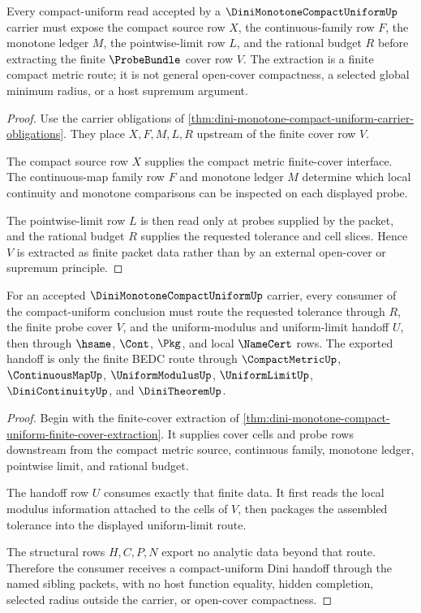 \begin{theorem}
\label{thm:dini-monotone-compact-uniform-finite-cover-extraction}
Every compact-uniform read accepted by a $\DiniMonotoneCompactUniformUp$ carrier must expose the compact source row $X$, the continuous-family row $F$, the monotone ledger $M$, the pointwise-limit row $L$, and the rational budget $R$ before extracting the finite $\ProbeBundle$ cover row $V$. The extraction is a finite compact metric route; it is not general open-cover compactness, a selected global minimum radius, or a host supremum argument.
\end{theorem}
\begin{proof}
Use the carrier obligations of \autoref{thm:dini-monotone-compact-uniform-carrier-obligations}. They place $X,F,M,L,R$ upstream of the finite cover row $V$.

The compact source row $X$ supplies the compact metric finite-cover interface. The continuous-map family row $F$ and monotone ledger $M$ determine which local continuity and monotone comparisons can be inspected on each displayed probe.

The pointwise-limit row $L$ is then read only at probes supplied by the packet, and the rational budget $R$ supplies the requested tolerance and cell slices. Hence $V$ is extracted as finite packet data rather than by an external open-cover or supremum principle.
\end{proof}

\begin{theorem}
\label{thm:dini-monotone-compact-uniform-budget-handoff}
For an accepted $\DiniMonotoneCompactUniformUp$ carrier, every consumer of the compact-uniform conclusion must route the requested tolerance through $R$, the finite probe cover $V$, and the uniform-modulus and uniform-limit handoff $U$, then through $\hsame$, $\Cont$, $\Pkg$, and local $\NameCert$ rows. The exported handoff is only the finite BEDC route through $\CompactMetricUp$, $\ContinuousMapUp$, $\UniformModulusUp$, $\UniformLimitUp$, $\DiniContinuityUp$, and $\DiniTheoremUp$.
\end{theorem}
\begin{proof}
Begin with the finite-cover extraction of \autoref{thm:dini-monotone-compact-uniform-finite-cover-extraction}. It supplies cover cells and probe rows downstream from the compact metric source, continuous family, monotone ledger, pointwise limit, and rational budget.

The handoff row $U$ consumes exactly that finite data. It first reads the local modulus information attached to the cells of $V$, then packages the assembled tolerance into the displayed uniform-limit route.

The structural rows $H,C,P,N$ export no analytic data beyond that route. Therefore the consumer receives a compact-uniform Dini handoff through the named sibling packets, with no host function equality, hidden completion, selected radius outside the carrier, or open-cover compactness.
\end{proof}

